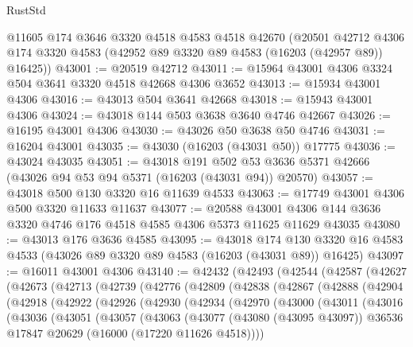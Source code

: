 \begin{lexlean}{RustStd}
\begin{coremodule}
    @11605
    @174
    @3646
    @3320
    @4518
    @4583
    @4518
    @42670
    (@20501 @42712 @4306 @174 @3320 @4583 (@42952 @89 @3320 @89 @4583 (@16203 (@42957 @89)) @16425))
@43001 := @20519 @42712
@43011 := @15964 @43001 @4306 @3324 @504 @3641 @3320 @4518 @42668 @4306 @3652
@43013 := @15934 @43001 @4306
@43016 := @43013 @504 @3641 @42668
@43018 := @15943 @43001 @4306
@43024 := @43018 @144 @503 @3638 @3640 @4746 @42667
@43026 := @16195 @43001 @4306
@43030 := @43026 @50 @3638 @50 @4746
@43031 := @16204 @43001
@43035 := @43030 (@16203 (@43031 @50)) @17775
@43036 := @43024 @43035
@43051 := @43018
    @191
    @502
    @53
    @3636
    @5371
    @42666
    (@43026 @94 @53 @94 @5371 (@16203 (@43031 @94)) @20570)
@43057 := @43018 @500 @130 @3320 @16 @11639 @4533
@43063 := @17749 @43001 @4306 @500 @3320 @11633 @11637
@43077 := @20588
    @43001
    @4306
    @144
    @3636
    @3320
    @4746
    @176
    @4518
    @4585
    @4306
    @5373
    @11625
    @11629
    @43035
@43080 := @43013 @176 @3636 @4585
@43095 := @43018
    @174
    @130
    @3320
    @16
    @4583
    @4533
    (@43026 @89 @3320 @89 @4583 (@16203 (@43031 @89)) @16425)
@43097 := @16011 @43001 @4306
@43140 := @42432
    (@42493
      (@42544
        (@42587
          (@42627
            (@42673
              (@42713
                (@42739
                  (@42776
                    (@42809
                      (@42838
                        (@42867
                          (@42888
                            (@42904
                              (@42918
                                (@42922
                                  (@42926
                                    (@42930
                                      (@42934
                                        (@42970
                                          (@43000
                                            (@43011
                                              (@43016
                                                (@43036
                                                  (@43051
                                                    (@43057
                                                      (@43063
                                                        (@43077
                                                          (@43080 (@43095 @43097))
                                                          @36536
                                                          @17847
                                                          @20629
                                                          (@16000 (@17220 @11626 @4518))))

\end{coremodule}
\end{lexlean}
